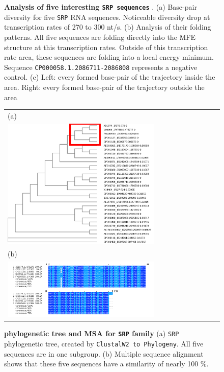 \documentclass[ twoside,openright,titlepage,numbers=noenddot,headinclude,%
                footinclude=false, cleardoublepage=empty,abstractoff, %
                BCOR=5mm,paper=a4,fontsize=11pt,%
                ngerman,american,%
                ]{scrreprt}
\begin{document}
\begin{figure}
\begin{tabular}{l}
\end{tabular}

\caption{{\bf Analysis of five interesting \texttt{SRP sequences} }. 
(a) Base-pair diversity for five \texttt{SRP} RNA sequences. Noticeable diversity drop at transcription rates of 270 to 300 nt/s.
(b) Analysis of their folding patterns. All five sequences are folding directly into the MFE structure at this transcription rates. Outside of this transcription rate area, these sequences are folding into a local energy minimum. Sequence \texttt{CP000058.1.2086711-2086808} represents a negative control.
(c) Left: every formed base-pair of the trajectory inside the area. Right: every formed base-pair of the trajectory outside the area}
\label{fig:SRPDecrease250_300}
\end{figure}
\FloatBarrier




\begin{figure}
\begin{tabular}{l}
(a) \\
\includegraphics[width=0.7\textwidth]{./pictures/Discussion_results/SRP/srp_pylotree.pdf}\\
(b) \\
\includegraphics[width=0.7\textwidth]{./pictures/Discussion_results/SRP/MSA_SRP_5seq.png}\\
\end{tabular}

\caption{{\bf phylogenetic tree and MSA for \texttt{SRP} family} 
(a) \texttt{SRP} phylogenetic tree, created by \texttt{ClustalW2 to Phylogeny}. All five sequences are in one subgroup.
(b) Multiple sequence alignment shows that these five sequences have a similarity of nearly 100 \%.
}
\label{fig:SRP_PhyloTree}
\end{figure}
\FloatBarrier
\end{document}
